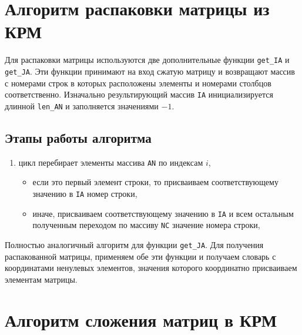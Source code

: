 \section{Алгоритм распаковки матрицы из КРМ}
Для распаковки матрицы используются две дополнительные функции \texttt{get\_IA} и \texttt{get\_JA}. Эти функции принимают на вход сжатую матрицу и возвращают массив с номерами строк в которых расположены элементы и номерами столбцов соответственно. Изначально результирующий массив \texttt{IA} инициализируется длинной \texttt{len\_AN} и заполняется значениями $-1$. 
\subsection*{Этапы работы алгоритма}
\begin{enumerate}
	\item цикл перебирает элементы массива \texttt{AN} по индексам $i$,
	\begin{itemize}
		\item если это первый элемент строки, то присваиваем соответствующему значению в \texttt{IA} номер строки,
		\item иначе, присваиваем соответствующему значению в \texttt{IA} и всем остальным полученным переходом по массиву \texttt{NC} значение номера строки,
	\end{itemize}
\end{enumerate}

Полностью аналогичный алгоритм для функции \texttt{get\_JA}.
Для получения распакованной матрицы, применяем обе эти функции и получаем словарь с координатами ненулевых элементов, значения которого координатно присваиваем элементам матрицы.

\section{Алгоритм сложения матриц в КРМ}
